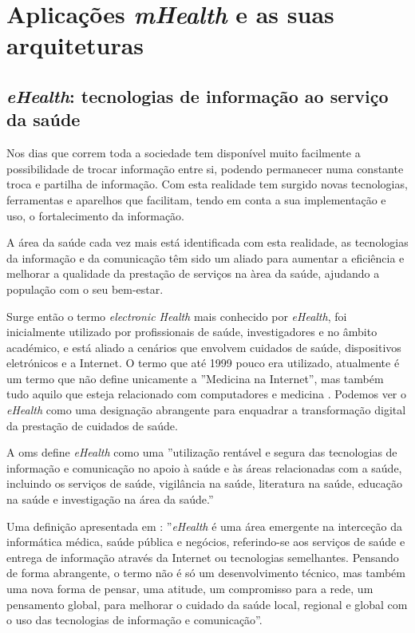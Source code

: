\chapter{Aplica\c c\~oes \textit{mHealth} e as suas arquiteturas}



\section{\textit{eHealth}: tecnologias de informação ao serviço da saúde}
Nos dias que correm toda a sociedade tem dispon\'ivel muito facilmente a possibilidade de trocar informa\c c\~ao entre si, podendo permanecer numa constante troca e partilha de informa\c c\~ao.  Com esta realidade tem surgido novas tecnologias, ferramentas e aparelhos que facilitam, tendo em conta a sua implementa\c c\~ao e uso, o fortalecimento da informa\c c\~ao. 
\par
A \'area da sa\'ude cada vez mais est\'a identificada com esta realidade, as tecnologias da informa\c c\~ao e da comunica\c c\~ao t\^em sido um aliado para aumentar a efici\^encia e melhorar a qualidade da presta\c c\~ao de servi\c cos na \`area da sa\'ude, ajudando a popula\c c\~ao com o seu bem-estar. 
\par
Surge então o termo \textit{electronic Health} mais conhecido por \textit{eHealth}, foi inicialmente utilizado por profissionais de sa\'ude, investigadores e no \^ambito acad\'emico, e est\'a aliado a cen\'arios que envolvem cuidados de sa\'ude, dispositivos eletr\'onicos e a Internet. O termo que at\'e 1999 pouco era utilizado, atualmente \'e um termo que n\~ao define unicamente a ''Medicina na Internet'', mas tamb\'em tudo aquilo que esteja relacionado com computadores e medicina \cite{ehealth}. Podemos ver o \textit{eHealth} como uma designação abrangente para enquadrar a transformação digital da prestação de cuidados de saúde.
\par A \gls{oms} define \textit{eHealth} \cite{ehealth_oms} como uma ''utiliza\c c\~ao rent\'avel e segura das tecnologias de informa\c c\~ao e comunica\c c\~ao no apoio \`a sa\'ude e \`as \'areas relacionadas com a sa\'ude, incluindo os servi\c cos de sa\'ude, vigil\^ancia na sa\'ude, literatura na sa\'ude, educa\c c\~ao na sa\'ude e investiga\c c\~ao na \'area da sa\'ude.''
\par
Uma defini\c c\~ao apresentada em \cite{ehealth}: ''\textit{eHealth} \'e uma \'area emergente na interce\c c\~ao da inform\'atica m\'edica, sa\'ude p\'ublica e neg\'ocios, referindo-se aos servi\c cos de sa\'ude e entrega de informa\c c\~ao atrav\'es da Internet ou tecnologias semelhantes. Pensando de forma abrangente, o termo n\~ao \'e s\'o um desenvolvimento t\'ecnico, mas tamb\'em uma nova forma de pensar, uma atitude, um compromisso para a rede, um pensamento global, para melhorar o cuidado da sa\'ude local, regional e global com o uso das tecnologias de informa\c c\~ao e comunica\c c\~ao''.
